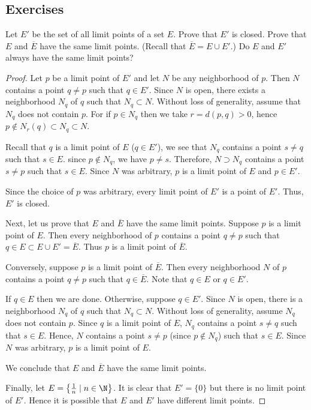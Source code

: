 \subsection*{Exercises}

\begin{exercise}
Let $E'$ be the set of all limit points of a set $E$. 
Prove that $E'$ is closed.
Prove that $E$ and $\overline{E}$ have the same limit points. (Recall that $\overline{E}=E \cup E'$.)
Do $E$ and $E'$ always have the same limit points?
\end{exercise}

\begin{proof}
Let $p$ be a limit point of $E'$ and let $N$ be any neighborhood of $p$.
Then $N$ contains a point $q \neq p$ such that $q \in E'$.
Since $N$ is open, there exists a neighborhood $N_q$ of $q$ such that $N_q \subset N$.
Without loss of generality, assume that $N_q$ does not contain $p$.
For if $p \in N_q$ then we take $r=d(p,q)>0$, hence $p \notin N_r(q) \subset N_q \subset N$.

Recall that $q$ is a limit point of $E$ ($q \in E'$), we see that $N_q$ contains a point $s \neq q$ such that $s \in E$.
since $p \notin N_q$, we have $p \neq s$.
Therefore, $N \supset N_q$ contains a point $s \neq p$ such that $s \in E$.
Since $N$ was arbitrary, $p$ is a limit point of $E$ and $p \in E'$.

Since the choice of $p$ was arbitrary, every limit point of $E'$ is a point of $E'$.
Thus, $E'$ is closed.

Next, let us prove that $E$ and $\overline{E}$ have the same limit points.
Suppose $p$ is a limit point of $E$.
Then every neighborhood of $p$ contains a point $q \neq p$ such that $q \in E \subset E \cup E' = \overline{E}$.
Thus $p$ is a limit point of $\overline{E}$. 

Conversely, suppose $p$ is a limit point of $\overline{E}$. 
Then every neighborhood $N$ of $p$ contains a point $q \neq p$ such that $q \in \overline{E}$.
Note that $q \in E$ or $q \in E'$. 

If $q \in E$ then we are done. 
Otherwise, suppose $q \in E'$. 
Since $N$ is open, there is a neighborhood $N_q$ of $q$ such that $N_q \subset N$.
Without loss of generality, assume $N_q$ does not contain $p$.
Since $q$ is a limit point of $E$, $N_q$ contains a point $s \neq q$ such that $s \in E$.
Hence, $N$ contains a point $s \neq p$ (since $p \notin N_q$) such that $s \in E$.
Since $N$ was arbitrary, $p$ is a limit point of $E$.

We conclude that $E$ and $\overline{E}$ have the same limit points.

Finally, let $E=\left\{\frac{1}{n} \mid n \in \N\right\}$. It is clear that $E' = \{0\}$ but there is no limit point of $E'$. Hence it is possible that $E$ and $E'$ have different limit points.
\end{proof}
